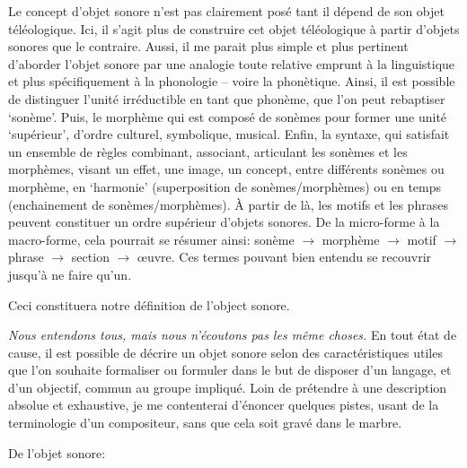 \documentclass{article}
\begin{document}
Le concept d'objet sonore n'est pas clairement posé tant il dépend de son objet téléologique. Ici, il s'agit plus de construire cet objet téléologique à partir d'objets sonores que le contraire.   
Aussi, il me parait plus simple et plus pertinent d'aborder l'objet sonore par une analogie toute relative emprunt à la linguistique et plus spécifiquement à la phonologie -- voire la phonètique. Ainsi, il est possible de distinguer l'unité irréductible en tant que phonème, que l'on peut rebaptiser `sonème'. Puis, le morphème qui est composé de sonèmes pour former une unité `supérieur', d'ordre culturel, symbolique, musical. Enfin, la syntaxe, qui satisfait un ensemble de règles combinant, associant, articulant les sonèmes et les morphèmes, visant un effet, une image, un concept, entre différents sonèmes ou morphème, en `harmonie' (superposition de sonèmes/morphèmes) ou en temps (enchainement de sonèmes/morphèmes). À partir de là, les motifs et les phrases peuvent constituer un ordre supérieur d'objets sonores. De la micro-forme à la macro-forme, cela pourrait se résumer ainsi:
sonème $\rightarrow$ morphème $\rightarrow$ motif $\rightarrow$ phrase $\rightarrow$ section $\rightarrow$ œuvre. Ces termes pouvant bien entendu se recouvrir jusqu'à ne faire qu'un.


Ceci constituera notre définition de l'object sonore.
\bigskip


\textit
{Nous entendons tous, mais nous n'écoutons pas les même choses.}
En tout état de cause, il est possible de décrire un objet sonore selon des caractéristiques utiles que l'on souhaite formaliser ou formuler dans le but de disposer d'un langage, et d'un objectif, commun au groupe impliqué. Loin de prétendre à une description absolue et exhaustive, je me contenterai d'énoncer quelques pistes, usant de la terminologie d'un compositeur, sans que cela soit gravé dans le marbre. 
\bigskip

De l'objet sonore:
\end{document}
